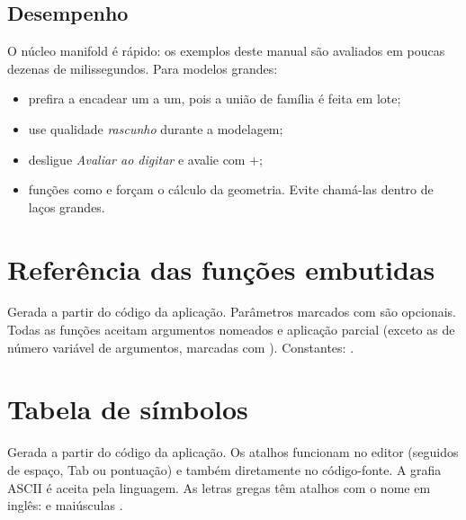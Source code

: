 \subsection{Desempenho}
O núcleo manifold é rápido: os exemplos deste manual são avaliados em poucas dezenas de milissegundos. Para modelos grandes:
\begin{itemize}
  \item prefira  a encadear  um a um, pois a união de família é feita em lote;
  \item use qualidade \emph{rascunho} durante a modelagem;
  \item desligue \emph{Avaliar ao digitar} e avalie com +;
  \item funções como  e  forçam o cálculo da geometria. Evite chamá-las dentro de laços grandes.
\end{itemize}

\section{Referência das funções embutidas}\label{sec:referencia}
Gerada a partir do código da aplicação. Parâmetros marcados com  são opcionais. Todas as funções aceitam
argumentos nomeados e aplicação parcial (exceto as de número variável de argumentos, marcadas com ).
Constantes: .


\section{Tabela de símbolos}\label{sec:tabela}
Gerada a partir do código da aplicação. Os atalhos funcionam no editor (seguidos de espaço, Tab ou pontuação) e também
diretamente no código-fonte. A grafia ASCII é aceita pela linguagem. As letras gregas têm atalhos com o nome em inglês:
\code{\alpha \beta \gamma \delta \epsilon \theta \lambda \mu \rho \sigma \phi \psi \omega} e maiúsculas
\code{\Gamma \Delta \Theta \Lambda \Phi \Psi \Omega}.


